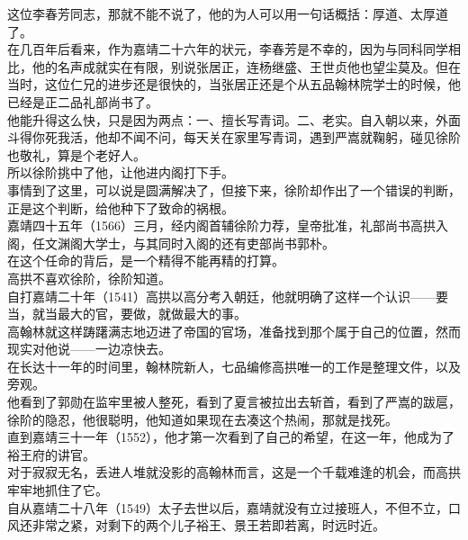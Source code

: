 \begin{multicols}{\theparacolNo}
这位李春芳同志，那就不能不说了，他的为人可以用一句话概括：厚道、太厚道了。\\

在几百年后看来，作为嘉靖二十六年的状元，李春芳是不幸的，因为与同科同学相比，他的名声成就实在有限，别说张居正，连杨继盛、王世贞他也望尘莫及。但在当时，这位仁兄的进步还是很快的，当张居正还是个从五品翰林院学士的时候，他已经是正二品礼部尚书了。\\

他能升得这么快，只是因为两点：一、擅长写青词。二、老实。自入朝以来，外面斗得你死我活，他却不闻不问，每天关在家里写青词，遇到严嵩就鞠躬，碰见徐阶也敬礼，算是个老好人。\\

所以徐阶挑中了他，让他进内阁打下手。\\

事情到了这里，可以说是圆满解决了，但接下来，徐阶却作出了一个错误的判断，正是这个判断，给他种下了致命的祸根。\\

嘉靖四十五年（1566）三月，经内阁首辅徐阶力荐，皇帝批准，礼部尚书高拱入阁，任文渊阁大学士，与其同时入阁的还有吏部尚书郭朴。\\

在这个任命的背后，是一个精得不能再精的打算。\\

高拱不喜欢徐阶，徐阶知道。\\

自打嘉靖二十年（1541）高拱以高分考入朝廷，他就明确了这样一个认识——要当，就当最大的官，要做，就做最大的事。\\

高翰林就这样踌躇满志地迈进了帝国的官场，准备找到那个属于自己的位置，然而现实对他说——一边凉快去。\\

在长达十一年的时间里，翰林院新人，七品编修高拱唯一的工作是整理文件，以及旁观。\\

他看到了郭勋在监牢里被人整死，看到了夏言被拉出去斩首，看到了严嵩的跋扈，徐阶的隐忍，他很聪明，他知道如果现在去凑这个热闹，那就是找死。\\

直到嘉靖三十一年（1552），他才第一次看到了自己的希望，在这一年，他成为了裕王府的讲官。\\

对于寂寂无名，丢进人堆就没影的高翰林而言，这是一个千载难逢的机会，而高拱牢牢地抓住了它。\\

自从嘉靖二十八年（1549）太子去世以后，嘉靖就没有立过接班人，不但不立，口风还非常之紧，对剩下的两个儿子裕王、景王若即若离，时远时近。\\


\end{multicols}

